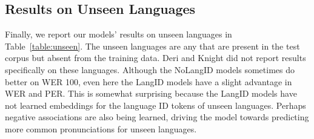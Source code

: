\documentclass[11pt,letterpaper]{article}
\begin{document}
\begin{table}[h]
\caption{High Resource Results}
\label{table:high}
\end{table}

\subsection{Results on Unseen Languages}
Finally, we report our models' results on unseen languages in Table~\ref{table:unseen}. The unseen languages are any that are present in the test corpus but absent from the training data. Deri and Knight did not report results specifically on these languages. Although the NoLangID models sometimes do better on WER 100, even here the LangID models have a slight advantage in WER and PER. This is somewhat surprising because the LangID models have not learned embeddings for the language ID tokens of unseen languages. Perhaps negative associations are also being learned, driving the model towards predicting more common pronunciations for unseen languages.

\begin{table}[h]
\caption{Results on languages not in the training corpus}
\label{table:unseen}
\end{table}
\end{document}
